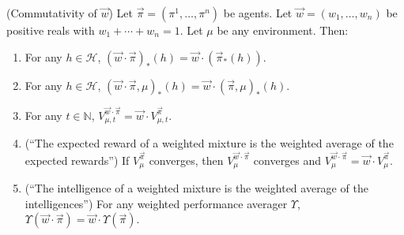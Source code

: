 \documentclass[runningheads]{llncs}
\begin{document}
\begin{theorem}
\label{maintheorem}
    (Commutativity of $\vec w$)
    Let $\vec\pi=(\pi^1,\ldots,\pi^n)$ be agents.
    Let $\vec w=(w_1,\ldots,w_n)$ be positive reals with
    $w_1+\cdots+w_n=1$. Let $\mu$ be any environment.
    Then:
    \begin{enumerate}
        \item
        For any $h\in\mathcal H$,
        $(\vec w\cdot\vec\pi)_*(h)=\vec w\cdot(\vec\pi_*(h))$.
        \item
        For any $h\in\mathcal H$,
        $(\vec w\cdot \vec\pi,\mu)_*(h)=\vec w\cdot(\vec\pi,\mu)_*(h)$.
        \item
        For any $t\in\mathbb N$,
        $V^{\vec w\cdot \vec\pi}_{\mu,t}=\vec w\cdot V^{\vec\pi}_{\mu,t}$.
        \item
        (``The expected reward of a weighted mixture is the weighted
        average of the expected rewards'')
        If $V^{\vec\pi}_\mu$ converges, then $V^{\vec w\cdot\vec\pi}_\mu$
        converges and $V^{\vec w\cdot\vec\pi}_\mu=\vec w\cdot V^{\vec\pi}_\mu$.
        \item
        (``The intelligence of a weighted mixture is the weighted average
        of the intelligences'')
        For any weighted performance averager $\Upsilon$,
        $\Upsilon(\vec w\cdot\vec\pi)=\vec w\cdot\Upsilon(\vec\pi)$.
    \end{enumerate}
\end{theorem}
\end{document}
